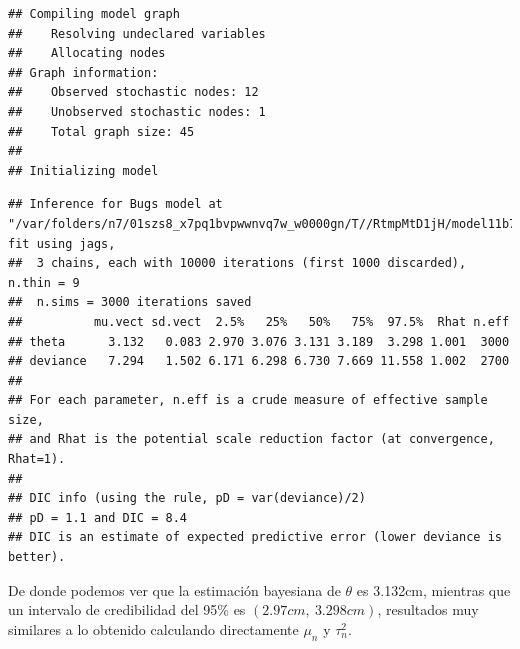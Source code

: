 \begin{Eje}
\begin{knitrout}
\begin{kframe}
\begin{alltt}
 \hlkwb{<-} 
 \hlkwb{<-} \hlstd{(}\hlstd{,} \hlstd{,} \hlstd{,} \hlstd{,} \hlstd{,} \hlstd{,} \hlstd{,} \hlstd{,} \hlstd{,} \hlstd{,} \hlstd{,} \hlstd{)}

 \hlkwb{<-} \hlstd{(}\hlstd{,}\hlstd{)}
 \hlkwb{<-} \hlstd{(}\hlstd{)}
 \hlkwb{<-} \hlstd{()\{}
\hlstd{(}\hlstd{=}\hlstd{(}\hlstd{))}
\hlstd{\}}

 \hlkwb{<-} \hlstd{(}  \hlstd{=}\hlstd{,}
\hlstd{=}\hlstd{,} 
\end{alltt}
\begin{verbatim}
## Compiling model graph
##    Resolving undeclared variables
##    Allocating nodes
## Graph information:
##    Observed stochastic nodes: 12
##    Unobserved stochastic nodes: 1
##    Total graph size: 45
## 
## Initializing model
\end{verbatim}
\begin{alltt}
\end{alltt}
\begin{verbatim}
## Inference for Bugs model at "/var/folders/n7/01szs8_x7pq1bvpwwnvq7w_w0000gn/T//RtmpMtD1jH/model11b779fb6f8b.txt", fit using jags,
##  3 chains, each with 10000 iterations (first 1000 discarded), n.thin = 9
##  n.sims = 3000 iterations saved
##          mu.vect sd.vect  2.5%   25%   50%   75%  97.5%  Rhat n.eff
## theta      3.132   0.083 2.970 3.076 3.131 3.189  3.298 1.001  3000
## deviance   7.294   1.502 6.171 6.298 6.730 7.669 11.558 1.002  2700
## 
## For each parameter, n.eff is a crude measure of effective sample size,
## and Rhat is the potential scale reduction factor (at convergence, Rhat=1).
## 
## DIC info (using the rule, pD = var(deviance)/2)
## pD = 1.1 and DIC = 8.4
## DIC is an estimate of expected predictive error (lower deviance is better).
\end{verbatim}
\end{kframe}
\end{knitrout}
    De donde podemos ver que la estimaci\'on bayesiana de $\theta$ es 3.132cm, mientras que un intervalo de credibilidad del 95\% es $(2.97cm,\ 3.298cm)$, resultados muy similares a lo obtenido calculando directamente $\mu_n$ y $\tau^2_n$.
    

\end{Eje}
